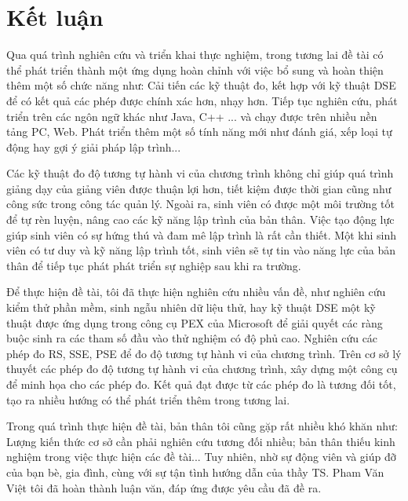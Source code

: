 \section{Kết luận}
Qua quá trình nghiên cứu và triển khai thực nghiệm, trong tương lai đề
tài có thể phát triển thành một ứng dụng hoàn chỉnh với việc bổ
sung và hoàn thiện thêm một số chức năng như: Cải tiến các kỹ thuật đo, kết hợp với kỹ thuật DSE để có kết quả các phép được chính xác hơn, nhạy hơn. Tiếp tục nghiên cứu, phát triển trên các ngôn ngữ khác như Java, C++ ... và chạy được trên nhiều nền tảng PC, Web. Phát triển thêm một số tính năng mới như đánh giá, xếp loại tự động hay gợi ý giải pháp lập trình...

Các kỹ thuật đo độ tương tự hành vi của chương trình không chỉ giúp quá trình giảng dạy của giảng viên được thuận lợi hơn, tiết kiệm được thời gian cũng như công sức trong công tác quản lý. Ngoài ra, sinh viên có được một môi trường tốt để tự rèn luyện, nâng cao các kỹ năng lập trình của bản thân. Việc tạo động lực giúp sinh viên có sự hứng thú và đam mê lập trình là rất cần
thiết. Một khi sinh viên có tư duy và kỹ năng lập trình tốt, sinh viên
sẽ tự tin vào năng lực của bản thân để tiếp tục phát phát triển sự
nghiệp sau khi ra trường.

Để thực hiện đề tài, tôi đã thực hiện nghiên cứu nhiều vấn đề, như nghiên cứu kiểm thử phần mềm, sinh ngẫu nhiên dữ liệu thử, hay kỹ thuật DSE một kỹ thuật
được ứng dụng trong công cụ PEX của Microsoft để giải quyết các ràng
buộc sinh ra các tham số đầu vào thử nghiệm có độ phủ cao. Nghiên cứu
các phép đo RS, SSE, PSE để đo độ tương tự hành vi của chương
trình. Trên cơ sở lý thuyết các phép đo độ tương tự hành vi của chương trình, xây dựng một công cụ để minh họa cho các phép đo. Kết quả đạt được từ các phép đo là tương đối tốt, tạo ra nhiều hướng có thể phát triển thêm trong tương lai.

Trong quá trình thực hiện đề tài, bản thân tôi cũng gặp rất nhiều
khó khăn như: Lượng kiến thức cơ sở cần phải nghiên cứu tương đối nhiều; bản thân thiếu kinh nghiệm trong việc thực hiện các đề tài... Tuy nhiên, nhờ sự động viên và giúp đỡ của bạn bè, gia đình, cùng với sự tận tình hướng dẫn của thầy TS. Pham Văn Việt tôi đã hoàn thành luận văn, đáp ứng được yêu cầu đã đề ra.

